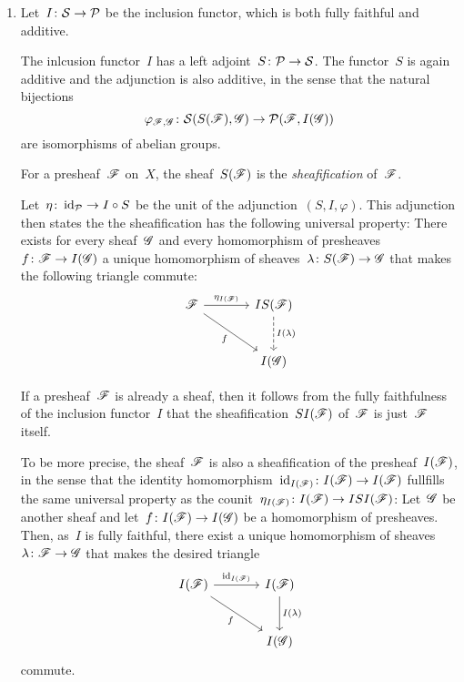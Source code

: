 \begin{example}
\begin{enumerate}
    \item
      Let~$I \colon \mathcal{S} \to \mathcal{P}$ be the inclusion functor, which is both fully faithful and additive.
      
      \begin{fact}
        The inlcusion functor~$I$ has a left adjoint~$S \colon \mathcal{P} \to \mathcal{S}$.
        The functor~$S$ is again additive and the adjunction is also additive, in the sense that the natural bijections
        \[
                  \varphi_{\mathscr{F},\mathscr{G}}
          \colon  \mathcal{S}(S(\mathscr{F}), \mathscr{G})
          \to     \mathcal{P}(\mathscr{F}, I(\mathscr{G}))
        \]
        are isomorphisms of abelian groups.
      \end{fact}
      
      \begin{definitionnonum}
        For a presheaf~$\mathscr{F}$ on~$X$, the sheaf~$S(\mathscr{F})$ is the \emph{sheafification} of~$\mathscr{F}$.
      \end{definitionnonum}
      
      Let~$\eta \colon \operatorname{id}_{\mathcal{P}} \to I \circ S$ be the unit of the adjunction~$(S,I,\varphi)$.
      This adjunction then states the the sheafification has the following universal property:      
      There exists for every sheaf~$\mathscr{G}$ and every homomorphism of presheaves~$f \colon \mathscr{F} \to I(\mathscr{G})$ a unique homomorphism of sheaves~$\lambda \colon S(\mathscr{F}) \to \mathscr{G}$ that makes the following triangle commute:
      \[
        \begin{tikzcd}[sep = large]
            \Fs
            \arrow{r}[above]{\eta_{I(\Fs)}}
            \arrow{dr}[below left]{f}
          & IS(\Fs)
            \arrow[dashed]{d}[right]{I(\lambda)}
          \\
            {}
          & I(\Gs)
        \end{tikzcd}
      \]
      
      If a presheaf~$\mathscr{F}$ is already a sheaf, then it follows from the fully faithfulness of the inclusion functor~$I$ that the sheafification~$SI(\mathscr{F})$ of~$\mathscr{F}$ is just~$\mathscr{F}$ itself.
      
      To be more precise, the sheaf~$\mathscr{F}$ is also a sheafification of the presheaf~$I(\mathscr{F})$, in the sense that the identity homomorphism~$\operatorname{id}_{I(\mathscr{F})} \colon I(\mathscr{F}) \to I(\mathscr{F})$ fullfills the same universal property as the counit~$\eta_{I(\mathscr{F})} \colon I(\mathscr{F}) \to ISI(\mathscr{F})$:
      Let~$\mathscr{G}$ be another sheaf and let~$f \colon I(\mathscr{F}) \to I(\mathscr{G})$ be a homomorphism of presheaves.
      Then, as~$I$ is fully faithful, there exist a unique homomorphism of sheaves~$\lambda \colon \mathscr{F} \to \mathscr{G}$ that makes the desired triangle
      \[
        \begin{tikzcd}[sep = large]
            I(\Fs)
            \arrow{r}[above]{\id_{I(\Fs)}}
            \arrow{dr}[below left]{f}
          & I(\Fs)
            \arrow{d}[right]{I(\lambda)}
          \\
            {}
          & I(\Gs)
        \end{tikzcd}
      \]
      commute.
      

\end{enumerate}
\end{example}
